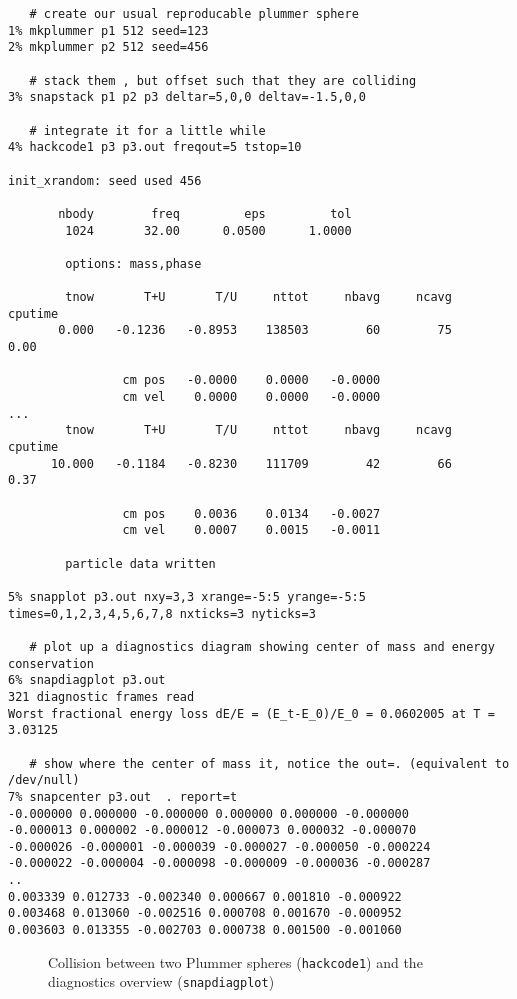 \footnotesize\begin{verbatim}
   # create our usual reproducable plummer sphere
1% mkplummer p1 512 seed=123
2% mkplummer p2 512 seed=456

   # stack them , but offset such that they are colliding
3% snapstack p1 p2 p3 deltar=5,0,0 deltav=-1.5,0,0 

   # integrate it for a little while
4% hackcode1 p3 p3.out freqout=5 tstop=10
 
init_xrandom: seed used 456
 
       nbody        freq         eps         tol
        1024       32.00      0.0500      1.0000
 
        options: mass,phase
 
        tnow       T+U       T/U     nttot     nbavg     ncavg   cputime
       0.000   -0.1236   -0.8953    138503        60        75      0.00
 
                cm pos   -0.0000    0.0000   -0.0000
                cm vel    0.0000    0.0000   -0.0000
...
        tnow       T+U       T/U     nttot     nbavg     ncavg   cputime
      10.000   -0.1184   -0.8230    111709        42        66      0.37
 
                cm pos    0.0036    0.0134   -0.0027
                cm vel    0.0007    0.0015   -0.0011
 
        particle data written

5% snapplot p3.out nxy=3,3 xrange=-5:5 yrange=-5:5 times=0,1,2,3,4,5,6,7,8 nxticks=3 nyticks=3

   # plot up a diagnostics diagram showing center of mass and energy conservation
6% snapdiagplot p3.out
321 diagnostic frames read
Worst fractional energy loss dE/E = (E_t-E_0)/E_0 = 0.0602005 at T = 3.03125

   # show where the center of mass it, notice the out=. (equivalent to /dev/null)
7% snapcenter p3.out  . report=t
-0.000000 0.000000 -0.000000 0.000000 0.000000 -0.000000
-0.000013 0.000002 -0.000012 -0.000073 0.000032 -0.000070
-0.000026 -0.000001 -0.000039 -0.000027 -0.000050 -0.000224
-0.000022 -0.000004 -0.000098 -0.000009 -0.000036 -0.000287
..
0.003339 0.012733 -0.002340 0.000667 0.001810 -0.000922
0.003468 0.013060 -0.002516 0.000708 0.001670 -0.000952
0.003603 0.013355 -0.002703 0.000738 0.001500 -0.001060

\end{verbatim}\normalsize

\begin{figure}[h!]
\caption{Collision between two Plummer spheres ({\tt hackcode1}) 
and the diagnostics overview ({\tt snapdiagplot})
}
\label{f:kira}
\end{figure}


